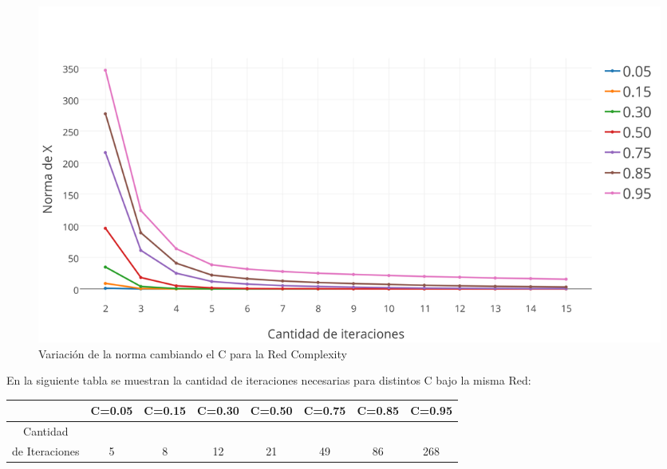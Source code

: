 \documentclass[a4paper]{article}
\begin{document}
\begin{figure}[h!]
  \begin{center}
	\includegraphics[scale=0.50]{imagenes/exp12/complexityPAGERANK.png}
	\caption{Variaci\'on de la norma cambiando el C para la Red Complexity}
	\label{nombreparareferenciar}
  \end{center}
\end{figure}
En la siguiente tabla se muestran la cantidad de iteraciones necesarias para distintos C bajo la misma Red: \\
 \begin{tabular}[c]{|c|c|c|c|c|c|c|c|}
\hline
 & C=0.05 & C=0.15 & C=0.30 & C=0.50 & C=0.75 & C=0.85 & C=0.95 \\
\hline
Cantidad &  & & & & & & \\ 
de Iteraciones & 5 & 8 & 12 & 21 & 49 & 86 & 268 \\
\hline
	\end{tabular}\\\\
\newpage
\end{document}
